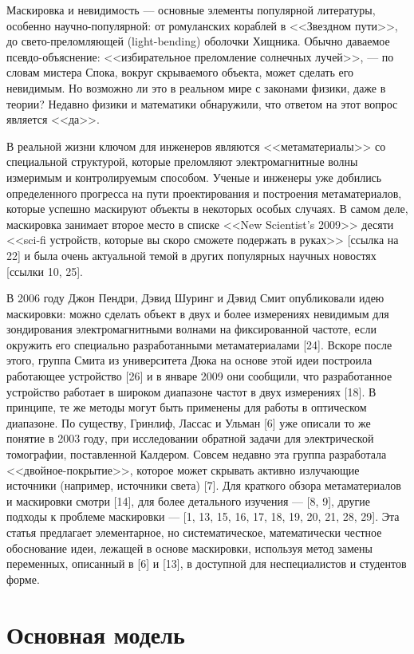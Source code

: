 \documentclass[a4paper, 12pt]{article}
\begin{document}
Маскировка и невидимость --- основные элементы популярной литературы, особенно научно-популярной: от
ромуланских кораблей в <<Звездном пути>>, до свето-преломляющей (light-bending) оболочки Хищника. Обычно
даваемое псевдо-объяснение: <<избирательное преломление солнечных лучей>>, --- по словам мистера Спока,
вокруг скрываемого объекта, может сделать его невидимым. Но возможно ли это в реальном мире с законами
физики, даже в теории? Недавно физики и математики обнаружили, что ответом на этот вопрос является
<<да>>.


В реальной жизни ключом для инженеров являются <<метаматериалы>> со специальной структурой, которые
преломляют электромагнитные волны измеримым и контролируемым способом. Ученые и инженеры уже добились
определенного прогресса на пути проектирования и построения метаматериалов, которые успешно маскируют
объекты в некоторых особых случаях. В самом деле, маскировка занимает второе место в списке <<New
Scientist's 2009>> десяти <<sci-fi устройств, которые вы скоро сможете подержать в руках>> [ссылка на 22] и
была очень актуальной темой в других популярных научных новостях [ссылки 10, 25].


В 2006 году Джон Пендри, Дэвид Шуринг и Дэвид Смит опубликовали идею маскировки: можно сделать объект в двух
и более измерениях невидимым для зондирования электромагнитными волнами на фиксированной частоте, если
окружить его специально разработанными метаматериалами [24]. Вскоре после этого, группа Смита из
университета Дюка на основе этой идеи построила работающее устройство [26] и в январе 2009 они сообщили, что
разработанное устройство работает в широком диапазоне частот в двух измерениях [18]. В принципе, те же
методы могут быть применены для работы в оптическом диапазоне. По существу, Гринлиф, Лассас и Ульман [6] уже
описали то же понятие в 2003 году, при исследовании обратной задачи для электрической томографии,
поставленной Калдером. Совсем недавно эта группа разработала <<двойное-покрытие>>, которое может скрывать
активно излучающие источники (например, источники света) [7]. Для краткого обзора метаматериалов и
маскировки смотри [14], для более детального изучения --- [8, 9], другие подходы к проблеме маскировки ---
[1, 13, 15, 16, 17, 18, 19, 20, 21, 28, 29]. Эта статья предлагает элементарное, но систематическое,
математически честное обоснование идеи, лежащей в основе маскировки, используя метод замены переменных,
описанный в [6] и [13], в доступной для неспециалистов и студентов форме.

\section{Основная модель}
\end{document}
